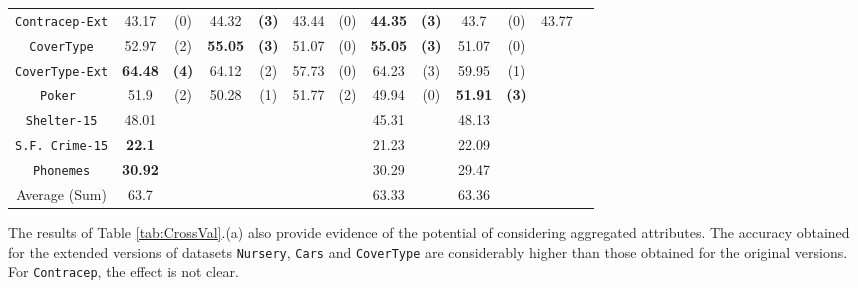 \begin{table*}[t]
\begin{tabular}{c|cc|cc|cc|cc|cc|cc}
{\tt Contracep-Ext} & 43.17    & (0)    & 44.32    &{\bf(3)}& 43.44    & (0)    &{\bf44.35}&{\bf(3)}& 43.7     & (0)    & 43.77    &        \\
{\tt CoverType}     & 52.97    & (2)    &{\bf55.05}&{\bf(3)}& 51.07    & (0)    &{\bf55.05}&{\bf(3)}& 51.07    & (0)    &          &        \\
{\tt CoverType-Ext} &{\bf64.48}&{\bf(4)}& 64.12    & (2)    & 57.73    & (0)    & 64.23    & (3)    & 59.95    & (1)    &          &        \\ 
{\tt Poker }        & 51.9     & (2)    & 50.28    & (1)    & 51.77    & (2)    & 49.94    & (0)    &{\bf51.91}&{\bf(3)}&          &        \\ 
{\tt Shelter-15}    & 48.01    &        &          &        &          &        & 45.31    &        & 48.13    &        &          &        \\   
{\tt S.F. Crime-15} &{\bf22.1} &        &          &        &          &        & 21.23    &        & 22.09    &        &          &        \\ 
{\tt Phonemes}      &{\bf30.92}&        &          &        &          &        & 30.29    &        & 29.47    &        &          &        \\
\hline
Average (Sum)       &     63.7 &        &          &        &          &        & 63.33    &        & 63.36    &        &          & 

\end{tabular}
\label{exp:thirdset}
\normalsize
\end{table*}


The results of  Table \ref{tab:CrossVal}.(a) also
provide evidence of  the potential
of considering aggregated attributes. 
The accuracy obtained for the extended versions of datasets
{\tt Nursery}, {\tt Cars} and {\tt CoverType} are considerably higher than those obtained for 
the original versions. For {\tt Contracep}, the effect is not clear.

